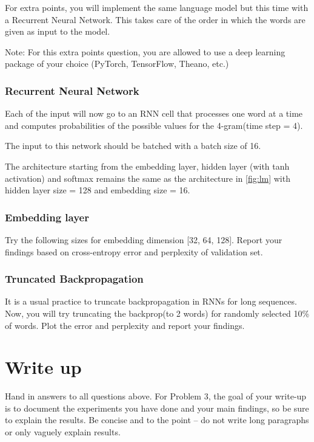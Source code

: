 \documentclass[10pt]{article}
\begin{document}
For extra points, you will implement the same language model but this time with a Recurrent Neural Network. This takes care of the order in which the words are given as input to the model.

Note: For this extra points question, you are allowed to use a deep learning package of your choice (PyTorch, TensorFlow, Theano, etc.)

\subsubsection{Recurrent Neural Network}
Each of the input will now go to an RNN cell that processes one word at a time and computes probabilities of the possible values for the 4-gram(time step = 4).

The input to this network should be batched with a batch size of 16.

The architecture starting from the embedding layer, hidden layer (with tanh activation) and softmax remains the same as the architecture in \ref{fig:lm} with hidden layer size = 128 and embedding size = 16.

\subsubsection{Embedding layer}
Try the following sizes for embedding dimension [32, 64, 128]. Report your findings based on cross-entropy error and perplexity of validation set.

\subsubsection{Truncated Backpropagation}
It is a usual practice to truncate backpropagation  in RNNs \cite{Williams90anefficient} for long sequences. Now, you will try truncating the backprop(to 2 words) for randomly selected 10\% of words. Plot the error and perplexity and report your findings.



\section*{Write up}
Hand in answers to all questions above. For Problem 3, 
the goal of your
write-up is to document the experiments you have done and your main findings, so
be sure to explain the results. Be concise and to the point -- do not write 
long paragraphs or only vaguely explain results. 
\end{document}
